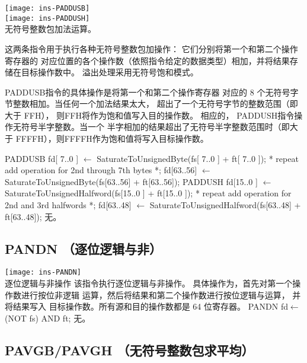 \begin{instructionblk}
  \texttt{[image: ins-PADDUSB]} \\
  \texttt{[image: ins-PADDUSH]} \\
  {无符号整数包加法运算。}
  {这两条指令用于执行各种无符号整数包加操作： 它们分别将第一个和第二个操作寄存器的
  对应位置的各个操作数（依照指令给定的数据类型）相加，并将结果存储在目标操作数中。
  溢出处理采用无符号饱和模式。

  PADDUSB指令的具体操作是将第一个和第二个操作寄存器
  对应的 8 个无符号字节整数相加。当任何一个加法结果太大，
  超出了一个无符号字节的整数范围（即大于 FFH），
  则FFH将作为饱和值写入目的操作数。
  相应的， PADDUSH指令操作无符号半字整数。当一个
  半字相加的结果超出了无符号半字整数范围时（即大于
  FFFFH），则FFFFH作为饱和值将写入目标操作数。}
  {PADDUSB \narrownewline
  fd[ 7..0 ]  $\leftarrow$ SaturateToUnsignedByte(fs[ 7..0 ] + ft[ 7..0 ]); \narrownewline
  * repeat add operation for 2nd through 7th bytes *; \narrownewline
  fd[63..56] $\leftarrow$ SaturateToUnsignedByte(fs[63..56] + ft[63..56]); \narrownewline \narrownewline
  PADDUSH \narrownewline
  fd[15..0 ] $\leftarrow$ SaturateToUnsignedHalfword(fs[15..0 ] + ft[15..0 ]); \narrownewline
  * repeat add operation for 2nd and 3rd halfwords *; \narrownewline
  fd[63..48] $\leftarrow$ SaturateToUnsignedHalfword(fs[63..48] + ft[63..48]);}
  {无。}
\end{instructionblk}

\subsection{PANDN （逐位逻辑与非）}

\begin{instructionblk}
  \texttt{[image: ins-PANDN]} \\
  {逐位逻辑与非操作}
  {该指令执行逐位逻辑与非操作。 具体操作为，首先对第一个操作数进行按位非逻辑
  运算，然后将结果和第二个操作数进行按位逻辑与运算， 并将结果写入
  目标操作数。所有源和目的操作数都是 64 位寄存器。}
  {PANDN \narrownewline
  fd$\leftarrow$(NOT fs) AND ft;}
  {无。}
\end{instructionblk}

\subsection{PAVGB/PAVGH （无符号整数包求平均）}

